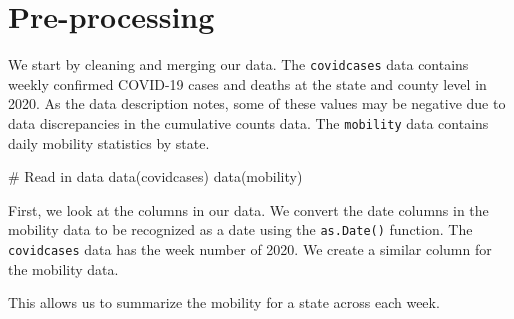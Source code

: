 \documentclass[
  letterpaper,
]{latex/krantz}
\makeatletter
\newenvironment{Shaded}{\begin{snugshade}}{\end{snugshade}}
\newcommand{\AttributeTok}[1]{\textcolor[rgb]{0.40,0.45,0.13}{#1}}
\newcommand{\CommentTok}[1]{\textcolor[rgb]{0.37,0.37,0.37}{#1}}
\newcommand{\FunctionTok}[1]{\textcolor[rgb]{0.28,0.35,0.67}{#1}}
\newcommand{\NormalTok}[1]{\textcolor[rgb]{0.00,0.23,0.31}{#1}}
\newcommand{\OtherTok}[1]{\textcolor[rgb]{0.00,0.23,0.31}{#1}}
\newcommand{\SpecialCharTok}[1]{\textcolor[rgb]{0.37,0.37,0.37}{#1}}
\newcommand{\StringTok}[1]{\textcolor[rgb]{0.13,0.47,0.30}{#1}}
\newenvironment{kframe}{%
\medskip{}
\setlength{\fboxsep}{.8em}
 \def\at@end@of@kframe{}%
 \ifinner\ifhmode%
  \def\at@end@of@kframe{\end{minipage}}%
  \begin{minipage}{\columnwidth}%
 \fi\fi%
 \def\FrameCommand##1{\hskip\@totalleftmargin \hskip-\fboxsep
 \colorbox{shadecolor}{##1}\hskip-\fboxsep
     \hskip-\linewidth \hskip-\@totalleftmargin \hskip\columnwidth}%
 \MakeFramed {\advance\hsize-\width
   \@totalleftmargin\z@ \linewidth\hsize
   \@setminipage}}%
 {\par\unskip\endMakeFramed%
 \at@end@of@kframe}
\renewenvironment{Shaded}{\begin{kframe}}{\end{kframe}}
\makeatother
\begin{document}
\section{Pre-processing}\label{pre-processing}

We start by cleaning and merging our data. The \texttt{covidcases} data
contains weekly confirmed COVID-19 cases and deaths at the state and
county level in 2020. As the data description notes, some of these
values may be negative due to data discrepancies in the cumulative
counts data. The \texttt{mobility} data contains daily mobility
statistics by state.

\begin{Shaded}
\begin{Highlighting}[]
\CommentTok{\# Read in data}
\FunctionTok{data}\NormalTok{(covidcases)}
\FunctionTok{data}\NormalTok{(mobility)}
\end{Highlighting}
\end{Shaded}

First, we look at the columns in our data. We convert the date columns
in the mobility data to be recognized as a date using the
\texttt{as.Date()}
function. The \texttt{covidcases} data has the week number of 2020. We
create a similar column for the mobility data.

\begin{Shaded}
\end{Shaded}

This allows us to summarize the mobility for a state across each week.
\end{document}
